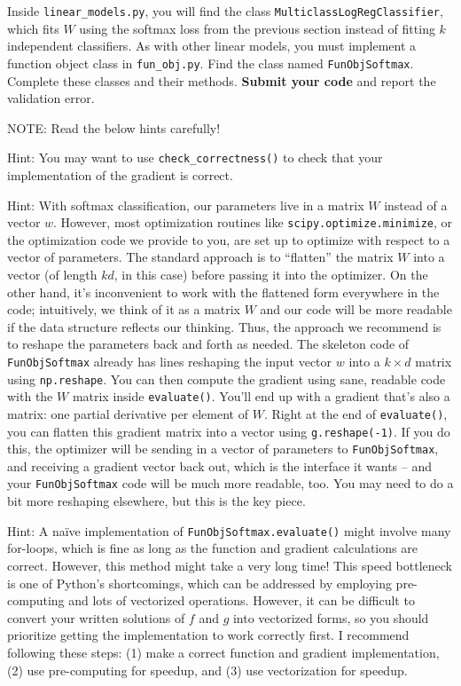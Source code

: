 \documentclass{article}
\def\blu#1{{\color{blu}#1}}
\def\red#1{{\color{red}#1}}
\begin{document}
\blu{
Inside \texttt{linear\_models.py}, you will find the class \texttt{MulticlassLogRegClassifier}, which fits $W$ using the softmax loss from the previous section instead of fitting $k$ independent classifiers. As with other linear models, you must implement a function object class in \texttt{fun\_obj.py}. Find the class named \texttt{FunObjSoftmax}. Complete these classes and their methods. \textbf{Submit your code} and report the validation error.
}

\red{NOTE: Read the below hints carefully!}

Hint: You may want to use \verb|check_correctness()| to check that your implementation of the gradient is correct.

Hint: With softmax classification, our parameters live in a matrix $W$ instead of a vector $w$. However, most optimization routines like \texttt{scipy.optimize.minimize}, or the optimization code we provide to you, are set up to optimize with respect to a vector of parameters. The standard approach is to ``flatten'' the matrix $W$ into a vector (of length $kd$, in this case) before passing it into the optimizer. On the other hand, it's inconvenient to work with the flattened form everywhere in the code; intuitively, we think of it as a matrix $W$ and our code will be more readable if the data structure reflects our thinking. Thus, the approach we recommend is to reshape the parameters back and forth as needed. The skeleton code of \texttt{FunObjSoftmax} already has lines reshaping the input vector $w$ into a $k \times d$ matrix using \texttt{np.reshape}. You can then compute the gradient using sane, readable code with the $W$ matrix inside \texttt{evaluate()}. You'll end up with a gradient that's also a matrix: one partial derivative per element of $W$. Right at the end of \texttt{evaluate()}, you can flatten this gradient matrix into a vector using \texttt{g.reshape(-1)}. If you do this, the optimizer will be sending in a vector of parameters to \texttt{FunObjSoftmax}, and receiving a gradient vector back out, which is the interface it wants -- and your \texttt{FunObjSoftmax} code will be much more readable, too. You may need to do a bit more reshaping elsewhere, but this is the key piece.

Hint: A na\"ive implementation of \texttt{FunObjSoftmax.evaluate()} might involve many for-loops, which is fine as long as the function and gradient calculations are correct. However, this method might take a very long time! This speed bottleneck is one of Python's shortcomings, which can be addressed by employing pre-computing and lots of vectorized operations. However, it can be difficult to convert your written solutions of $f$ and $g$ into vectorized forms, so you should prioritize getting the implementation to work correctly first. I recommend following these steps: (1) make a correct function and gradient implementation, (2) use pre-computing for speedup, and (3) use vectorization for speedup.
\end{document}
